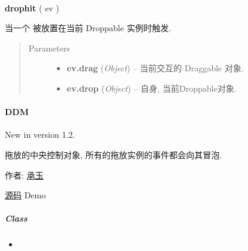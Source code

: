 \documentclass[letterpaper,10pt,english]{sphinxmanual}
\begin{document}

\begin{fulllineitems}
\label{api/component/dd/droppable:Droppable.drophit}~
\begin{DUlineblock}{0em}
\item[] \textbf{drophit} ( ev )
\item[] 当一个 {\hyperref[api/component/dd/draggable:module-Draggable]{}} 被放置在当前 Droppable 实例时触发.
\end{DUlineblock}
\begin{quote}\begin{description}
\item[{Parameters}] \leavevmode\begin{itemize}
\item {}
\textbf{ev.drag} (\emph{Object}) -- 当前交互的 Draggable 对象.

\item {}
\textbf{ev.drop} (\emph{Object}) -- 自身, 当前Droppable对象.

\end{itemize}

\end{description}\end{quote}

\end{fulllineitems}

\label{api/component/dd/ddm:module-DDM}

\paragraph{DDM}
\label{api/component/dd/ddm::doc}\label{api/component/dd/ddm:ddm}New in version 1.2.
\begin{DUlineblock}{0em}
\item[] 拖放的中央控制对象, 所有的拖放实例的事件都会向其冒泡.
\item[] 作者: \href{mailto:chengyu@taobao.com}{承玉}
\item[] \href{https://github.com/kissyteam/kissy/tree/master/src/dd/ddm.js}{源码}  \textbar{} Demo
\end{DUlineblock}


\subparagraph{Class}
\label{api/component/dd/ddm:class}\begin{itemize}
\item {}
{\hyperref[api/component/dd/ddm:DDM.DDM]{}}

\end{itemize}
\end{document}
